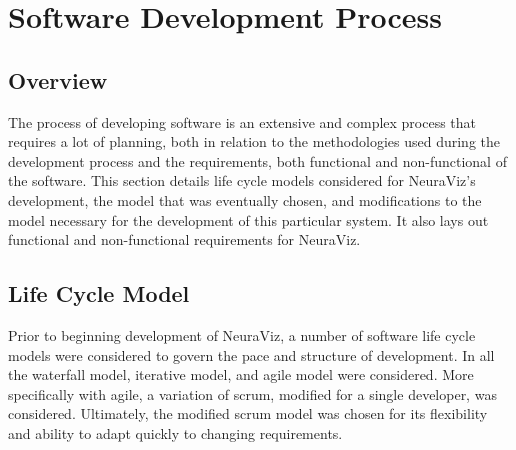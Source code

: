 \section{Software Development Process}
\label{sec:SoftwareDevelopmentProcess}

\subsection{Overview} 
The process of developing software is an extensive and complex process that requires a lot of planning, both in relation to the methodologies used during the development process and the requirements, both functional and non-functional of the software. This section details life cycle models considered for NeuraViz's development, the model that was eventually chosen, and modifications to the model necessary for the development of this particular system. It also lays out functional and non-functional requirements for NeuraViz.

\subsection{Life Cycle Model}
Prior to beginning development of NeuraViz, a number of software life cycle models were considered to govern the pace and structure of development. In all the waterfall model, iterative model, and agile model were considered. More specifically with agile, a variation of scrum, modified for a single developer, was considered. Ultimately, the modified scrum model was chosen for its flexibility and ability to adapt quickly to changing requirements.

